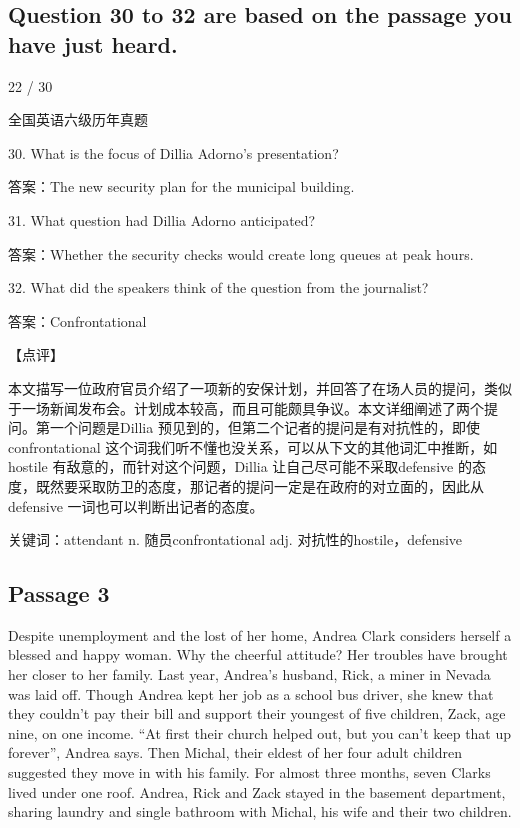 \documentclass[UTF8,11pt]{ctexart}
\begin{document}
\subsection*{Question 30 to 32 are based on the passage you have just heard.}


22 / 30


全国英语六级历年真题


30. What is the focus of Dillia Adorno’s presentation?


答案：The new security plan for the municipal building.


31. What question had Dillia Adorno anticipated?


答案：Whether the security checks would create long queues at peak hours.


32. What did the speakers think of the question from the journalist?


答案：Confrontational


【点评】


本文描写一位政府官员介绍了一项新的安保计划，并回答了在场人员的提问，类似于一场新闻发布会。计划成本较高，而且可能颇具争议。本文详细阐述了两个提问。第一个问题是Dillia 预见到的，但第二个记者的提问是有对抗性的，即使confrontational 这个词我们听不懂也没关系，可以从下文的其他词汇中推断，如hostile 有敌意的，而针对这个问题，Dillia 让自己尽可能不采取defensive 的态度，既然要采取防卫的态度，那记者的提问一定是在政府的对立面的，因此从defensive 一词也可以判断出记者的态度。


关键词：attendant n. 随员confrontational adj. 对抗性的hostile，defensive


\subsection*{Passage 3}


Despite unemployment and the lost of her home, Andrea Clark considers herself a blessed and happy woman. Why the cheerful attitude? Her troubles have brought her closer to her family. Last year, Andrea’s husband, Rick, a miner in Nevada was laid off. Though Andrea kept her job as a school bus driver, she knew that they couldn’t pay their bill and support their youngest of five children, Zack, age nine, on one income. “At first their church helped out, but you can’t keep that up forever”, Andrea says. Then Michal, their eldest of her four adult children suggested they move in with his family. For almost three months, seven Clarks lived under one roof. Andrea, Rick and Zack stayed in the basement department, sharing laundry and single bathroom with Michal, his wife and their two children.
\end{document}
